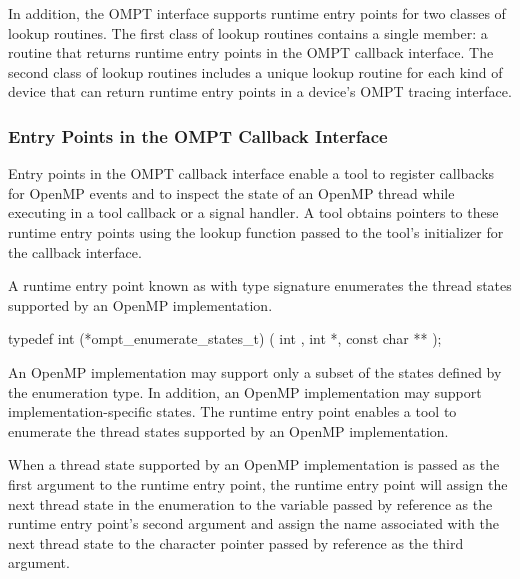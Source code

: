 In addition, the OMPT interface supports
runtime entry points for two classes of lookup routines. The first
class of lookup routines contains a single member: a
routine that returns runtime entry points in the OMPT callback interface.
The second class of lookup routines includes
a unique lookup routine for each kind of
device that can return runtime entry points in a device's OMPT tracing interface.

\subsubsection{Entry Points in the OMPT Callback Interface}
\label{sec:ompt-callback-entry-points}

Entry points in the OMPT callback interface enable a tool to register
callbacks for OpenMP events and to inspect the state of an OpenMP thread while
executing in a tool callback or a signal handler.
A tool obtains pointers to these runtime entry points
using the lookup function passed to the tool's initializer for the
callback interface.

\label{sec:ompt_enumerate_states_t}
\label{sec:ompt_enumerate_states}

\summary
A runtime entry point known as 
with type signature 
enumerates the thread states supported by an OpenMP
implementation.

\format


\begin{ccppspecific}
\begin{omptInquiry}
typedef int (*ompt_enumerate_states_t) (
  int ,
  int *,
  const char **
);
\end{omptInquiry}
\end{ccppspecific}


\descr
An OpenMP implementation may support only a subset of the states defined by
the  enumeration type. In addition, an
OpenMP implementation may support implementation-specific states.
The  runtime entry point enables a tool to
enumerate the thread states supported by an OpenMP implementation.

When a thread state supported by an OpenMP implementation is passed
as the first argument to the runtime entry point,
the runtime entry point will assign the next thread state in the enumeration to
the variable passed by reference as the runtime entry point's second argument
and assign the name associated with the next thread state
to the character pointer passed by reference as the third argument.

